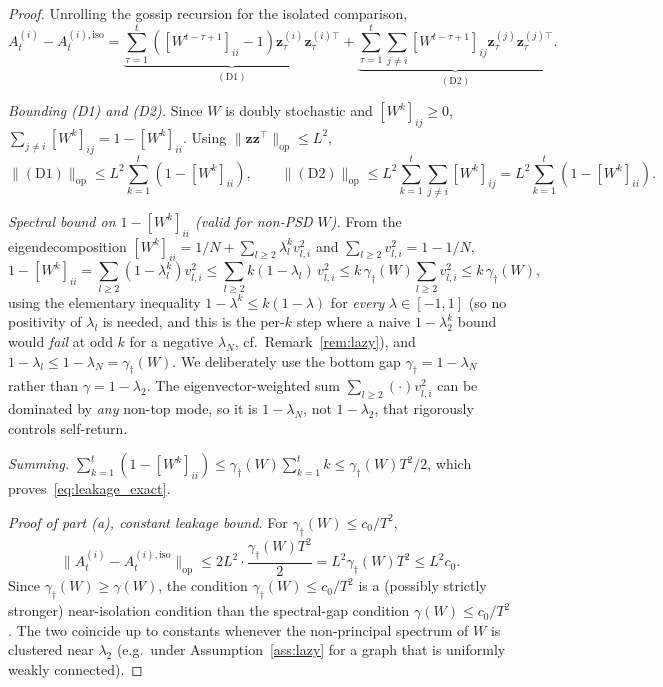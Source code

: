 \documentclass[11pt]{article}
\begin{document}
\begin{proof}
Unrolling the gossip recursion for the isolated comparison,
\[
A_t^{(i)}-A_t^{(i),\mathrm{iso}}
=\underbrace{\sum_{\tau=1}^t([W^{t-\tau+1}]_{ii}-1)
\bm{z}_\tau^{(i)}\bm{z}_\tau^{(i)\top}}_{\mathrm{(D1)}}
+\underbrace{\sum_{\tau=1}^t\sum_{j\neq i}[W^{t-\tau+1}]_{ij}
\bm{z}_\tau^{(j)}\bm{z}_\tau^{(j)\top}}_{\mathrm{(D2)}}.
\]

\textit{Bounding (D1) and (D2).}
Since $W$ is doubly stochastic and $[W^k]_{ij}\geq 0$,
$\sum_{j\neq i}[W^k]_{ij}=1-[W^k]_{ii}$.
Using $\|\bm{z}\bm{z}^\top\|_{\mathrm{op}}\leq L^2$,
\[
\|\mathrm{(D1)}\|_{\mathrm{op}}\leq L^2\sum_{k=1}^t(1-[W^k]_{ii}),
\qquad
\|\mathrm{(D2)}\|_{\mathrm{op}}\leq L^2\sum_{k=1}^t\sum_{j\neq i}[W^k]_{ij}
=L^2\sum_{k=1}^t(1-[W^k]_{ii}).
\]

\textit{Spectral bound on $1-[W^k]_{ii}$ (valid for non-PSD $W$).}
From the eigendecomposition $[W^k]_{ii}=1/N+\sum_{l\geq 2}\lambda_l^k v_{l,i}^2$
and $\sum_{l\geq 2}v_{l,i}^2=1-1/N$,
\[
1-[W^k]_{ii}=\sum_{l\geq 2}(1-\lambda_l^k)v_{l,i}^2
\leq\sum_{l\geq 2}k(1-\lambda_l)\,v_{l,i}^2
\leq k\,\gamma_\dagger(W)\sum_{l\geq 2}v_{l,i}^2
\leq k\,\gamma_\dagger(W),
\]
using the elementary inequality $1-\lambda^k\leq k(1-\lambda)$ for
\emph{every} $\lambda\in[-1,1]$ (so no positivity of $\lambda_l$ is
needed, and this is the per-$k$ step where a naive $1-\lambda_2^k$ bound
would \emph{fail} at odd $k$ for a negative $\lambda_N$, cf.\
Remark~\ref{rem:lazy}), and $1-\lambda_l\leq 1-\lambda_N=\gamma_\dagger(W)$.
We deliberately use the bottom gap $\gamma_\dagger=1-\lambda_N$ rather
than $\gamma=1-\lambda_2$. The eigenvector-weighted sum
$\sum_{l\geq2}(\cdot)v_{l,i}^2$ can be dominated by \emph{any} non-top
mode, so it is $1-\lambda_N$, not $1-\lambda_2$, that rigorously
controls self-return.

\textit{Summing.}
$\sum_{k=1}^t(1-[W^k]_{ii})\leq\gamma_\dagger(W)\sum_{k=1}^t k
\leq\gamma_\dagger(W)T^2/2$, which proves~\eqref{eq:leakage_exact}.

\textit{Proof of part (a), constant leakage bound.}
For $\gamma_\dagger(W)\leq c_0/T^2$,
\[
\|A_t^{(i)}-A_t^{(i),\mathrm{iso}}\|_{\mathrm{op}}
\leq 2L^2\cdot\frac{\gamma_\dagger(W)T^2}{2}=L^2\gamma_\dagger(W)T^2\leq L^2 c_0.
\]
Since $\gamma_\dagger(W)\geq\gamma(W)$, the condition
$\gamma_\dagger(W)\leq c_0/T^2$ is a (possibly strictly stronger)
near-isolation condition than the spectral-gap condition
$\gamma(W)\leq c_0/T^2$. The two coincide up to constants whenever the
non-principal spectrum of $W$ is clustered near $\lambda_2$ (e.g.\ under
Assumption~\ref{ass:lazy} for a graph that is uniformly weakly
connected).
\end{proof}
\end{document}
